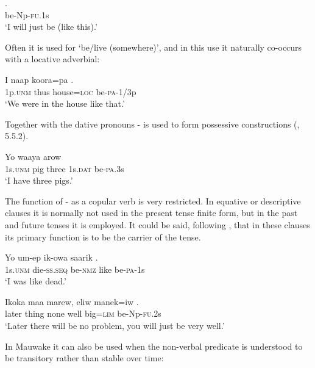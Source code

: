 \ea%
\label{ex:3:x1455}
\gll {}. \\
be-Np-\textsc{fu}.1s\\
\glt`I will just be (like this).'
\z

Often it is used for `be/live (somewhere)', and in this use it naturally co-occurs with a locative adverbial:

\ea%
\label{ex:3:x497}
\gll I naap koora=pa . \\
1p.\textsc{unm} thus house=\textsc{loc} be-\textsc{pa}-1/3p\\
\glt`We were in the house like that.'
\z

Together with the dative pronouns - is used to form possessive constructions  (, 5.5.2). 

\ea%
\label{ex:3:x258}
\gll Yo waaya arow   \\
1s.\textsc{unm} pig three 1s.\textsc{dat} be-\textsc{pa}.3s \\
\glt`I have three pigs.'
\z

The function of - as a copular verb is very restricted. In equative or descriptive clauses it is normally not used in the present tense finite form, but in the past  and future  tenses it is employed. It could be said, following \citet[92]{Givon1984}, that in these clauses its primary function is to be the carrier of the tense. 

\ea%
\label{ex:3:x259}
\gll Yo um-ep ik-owa saarik . \\
1s.\textsc{unm} die-\textsc{ss}.\textsc{seq} be-\textsc{nmz} like be-\textsc{pa}-1s\\
\glt`I was like dead.'
\z

\ea%
\label{ex:3:x1070}
\gll Ikoka maa marew, eliw manek=iw . \\
later thing none well big=\textsc{lim} be-Np-\textsc{fu}.2s\\
\glt`Later there will be no problem, you will just be very well.'
\z

In Mauwake it can also be used when the non-verbal predicate is understood to be transitory  rather than stable over time:

